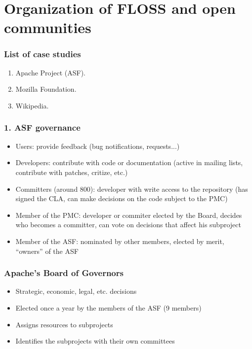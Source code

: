\documentclass{beamer}
\begin{document}
\section{Organization of FLOSS and open communities}


\begin{frame}
\frametitle{List of case studies}
\begin{enumerate}
 \item Apache Project (ASF).
 \item Mozilla Foundation.
 \item Wikipedia.
\end{enumerate}

\end{frame}


\begin{frame}
 \frametitle{1. ASF governance}
 \begin{itemize}
  \item Users: provide feedback (bug notifications, requests...)
  \item Developers: contribute with code or documentation (active 
in mailing lists, contribute with patches, critize, etc.)
  \item Committers (around 800): developer with write access to the 
repository (has signed the CLA, can make decisions on the code subject to the PMC)
  \item Member of the PMC: developer or commiter elected by the 
Board, decides who becomes a committer, can vote on decisions that affect his subproject
  \item Member of the ASF: nominated by other members, elected by merit, ``owners'' of the ASF
 \end{itemize}

\end{frame}


\begin{frame}
\frametitle{Apache's Board of Governors}

\begin{itemize}
\item Strategic, economic, legal, etc. decisions
\item Elected once a year by the members of the ASF (9 members)
\item Assigns resources to subprojects
\item Identifies the subprojects with their own committees
\end{itemize}

\end{frame}
\end{document}
